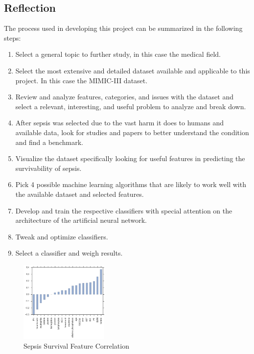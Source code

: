 \documentclass[11pt]{article}
\begin{document}
		
	\subsection{Reflection}
	The process used in developing this project can be summarized in the following steps:
	\begin{enumerate}
		\item Select a general topic to further study, in this case the medical field.
		\item Select the most extensive and detailed dataset available and applicable to this project. In this case the MIMIC-III dataset.
		\item Review and analyze features, categories, and issues with the dataset and select a relevant, interesting, and useful problem to analyze and break down.
		\item After sepsis was selected due to the vast harm it does to humans and available data, look for studies and papers to better understand the condition and find a benchmark.
		\item Visualize the dataset specifically looking for useful features in predicting the survivability of sepsis.
		\item Pick 4 possible machine learning algorithms that are likely to work well with the available dataset and selected features.
		\item Develop and train the respective classifiers with special attention on the architecture of the artificial neural network.
		\item Tweak and optimize classifiers.
		\item Select a classifier and weigh results.
	\end{enumerate}

		\begin{figure}
	\begin{center}
		\includegraphics[width=0.39\textwidth]{correlation.png}
	\end{center}
	\caption{Sepsis Survival Feature Correlation}
\end{figure}
\end{document}
